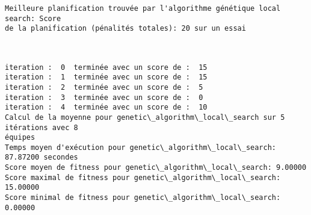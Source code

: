 \documentclass[11pt]{article}
\begin{document}
    \begin{Verbatim}[commandchars=\\\{\}]
Meilleure planification trouvée par l'algorithme génétique local search: Score
de la planification (pénalités totales): 20 sur un essai
    \end{Verbatim}

    \begin{center}
    \end{center}
    { \hspace*{\fill} \\}
    
    \begin{Verbatim}[commandchars=\\\{\}]
iteration :  0  terminée avec un score de :  15
iteration :  1  terminée avec un score de :  15
iteration :  2  terminée avec un score de :  5
iteration :  3  terminée avec un score de :  0
iteration :  4  terminée avec un score de :  10
Calcul de la moyenne pour genetic\_algorithm\_local\_search sur 5 itérations avec 8
équipes
Temps moyen d'exécution pour genetic\_algorithm\_local\_search: 87.87200 secondes
Score moyen de fitness pour genetic\_algorithm\_local\_search: 9.00000
Score maximal de fitness pour genetic\_algorithm\_local\_search: 15.00000
Score minimal de fitness pour genetic\_algorithm\_local\_search: 0.00000


    \end{Verbatim}

    \begin{center}
    \end{center}
    { \hspace*{\fill} \\}
    
\end{document}
